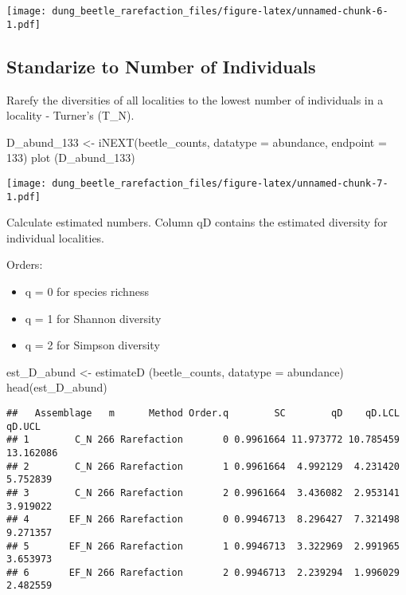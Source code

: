 \documentclass[
]{article}
\newenvironment{Shaded}{\begin{snugshade}}{\end{snugshade}}
\newcommand{\AttributeTok}[1]{\textcolor[rgb]{0.77,0.63,0.00}{#1}}
\newcommand{\DecValTok}[1]{\textcolor[rgb]{0.00,0.00,0.81}{#1}}
\newcommand{\FunctionTok}[1]{\textcolor[rgb]{0.00,0.00,0.00}{#1}}
\newcommand{\NormalTok}[1]{#1}
\newcommand{\OtherTok}[1]{\textcolor[rgb]{0.56,0.35,0.01}{#1}}
\newcommand{\StringTok}[1]{\textcolor[rgb]{0.31,0.60,0.02}{#1}}
\providecommand{\tightlist}{%
  \setlength{\itemsep}{0pt}\setlength{\parskip}{0pt}}
\begin{document}
\texttt{[image: dung\_beetle\_rarefaction\_files/figure-latex/unnamed-chunk-6-1.pdf]}

\hypertarget{standarize-to-number-of-individuals}{%
\subsection{Standarize to Number of
Individuals}\label{standarize-to-number-of-individuals}}

Rarefy the diversities of all localities to the lowest number of
individuals in a locality - Turner's (T\_N).

\begin{Shaded}
\begin{Highlighting}[]
\NormalTok{D\_abund\_133 }\OtherTok{\textless{}{-}} \FunctionTok{iNEXT}\NormalTok{(beetle\_counts, }\AttributeTok{datatype =} \StringTok{\textquotesingle{}abundance\textquotesingle{}}\NormalTok{, }\AttributeTok{endpoint =} \DecValTok{133}\NormalTok{)}
\FunctionTok{plot}\NormalTok{ (D\_abund\_133)}
\end{Highlighting}
\end{Shaded}

\texttt{[image: dung\_beetle\_rarefaction\_files/figure-latex/unnamed-chunk-7-1.pdf]}

Calculate estimated numbers. Column qD contains the estimated diversity
for individual localities.

Orders:

\begin{itemize}
\tightlist
\item
  q = 0 for species richness\\
\item
  q = 1 for Shannon diversity\\
\item
  q = 2 for Simpson diversity
\end{itemize}

\begin{Shaded}
\begin{Highlighting}[]
\NormalTok{est\_D\_abund }\OtherTok{\textless{}{-}} \FunctionTok{estimateD}\NormalTok{ (beetle\_counts, }\AttributeTok{datatype =} \StringTok{\textquotesingle{}abundance\textquotesingle{}}\NormalTok{)}
\FunctionTok{head}\NormalTok{(est\_D\_abund)}
\end{Highlighting}
\end{Shaded}

\begin{verbatim}
##   Assemblage   m      Method Order.q        SC        qD    qD.LCL    qD.UCL
## 1        C_N 266 Rarefaction       0 0.9961664 11.973772 10.785459 13.162086
## 2        C_N 266 Rarefaction       1 0.9961664  4.992129  4.231420  5.752839
## 3        C_N 266 Rarefaction       2 0.9961664  3.436082  2.953141  3.919022
## 4       EF_N 266 Rarefaction       0 0.9946713  8.296427  7.321498  9.271357
## 5       EF_N 266 Rarefaction       1 0.9946713  3.322969  2.991965  3.653973
## 6       EF_N 266 Rarefaction       2 0.9946713  2.239294  1.996029  2.482559
\end{verbatim}
\end{document}
